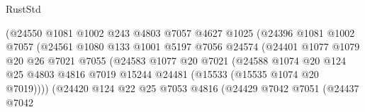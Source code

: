 \begin{lexlean}{RustStd}
\begin{coremodule}
                                    (@24550
                                      @1081
                                      @1002
                                      @243
                                      @4803
                                      @7057
                                      @4627
                                      @1025
                                      (@24396
                                        @1081
                                        @1002
                                        @7057
                                        (@24561
                                          @1080
                                          @133
                                          @1001
                                          @5197
                                          @7056
                                          @24574
                                          (@24401
                                            @1077
                                            @1079
                                            @20
                                            @26
                                            @7021
                                            @7055
                                            (@24583
                                              @1077
                                              @20
                                              @7021
                                              (@24588
                                                @1074
                                                @20
                                                @124
                                                @25
                                                @4803
                                                @4816
                                                @7019
                                                @15244
                                                @24481
                                                (@15533 (@15535 @1074 @20 @7019))))
                                            (@24420
                                              @124
                                              @22
                                              @25
                                              @7053
                                              @4816
                                              (@24429
                                                @7042
                                                @7051
                                                (@24437
                                                  @7042

\end{coremodule}
\end{lexlean}

